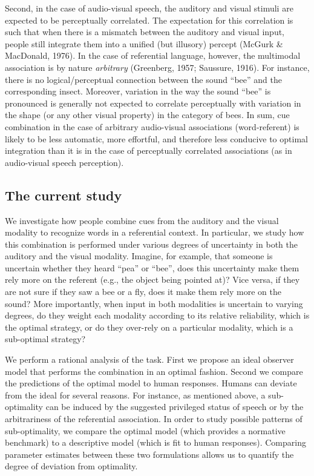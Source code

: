 \documentclass[english,floatsintext,man]{apa6}
\theoremstyle{definition}
\theoremstyle{definition}
\theoremstyle{definition}
\theoremstyle{remark}
\begin{document}
Second, in the case of audio-visual speech, the auditory and visual
stimuli are expected to be perceptually correlated. The expectation for
this correlation is such that when there is a mismatch between the
auditory and visual input, people still integrate them into a unified
(but illusory) percept (McGurk \& MacDonald, 1976). In the case of
referential language, however, the multimodal association is by nature
\emph{arbitrary} (Greenberg, 1957; Saussure, 1916). For instance, there
is no logical/perceptual connection between the sound \enquote{bee} and
the corresponding insect. Moreover, variation in the way the sound
\enquote{bee} is pronounced is generally not expected to correlate
perceptually with variation in the shape (or any other visual property)
in the category of bees. In sum, cue combination in the case of
arbitrary audio-visual associations (word-referent) is likely to be less
automatic, more effortful, and therefore less conducive to optimal
integration than it is in the case of perceptually correlated
associations (as in audio-visual speech perception).

\subsection{The current study}\label{the-current-study}

We investigate how people combine cues from the auditory and the visual
modality to recognize words in a referential context. In particular, we
study how this combination is performed under various degrees of
uncertainty in both the auditory and the visual modality. Imagine, for
example, that someone is uncertain whether they heard \enquote{pea} or
\enquote{bee}, does this uncertainty make them rely more on the referent
(e.g., the object being pointed at)? Vice versa, if they are not sure if
they saw a bee or a fly, does it make them rely more on the sound? More
importantly, when input in both modalities is uncertain to varying
degrees, do they weight each modality according to its relative
reliability, which is the optimal strategy, or do they over-rely on a
particular modality, which is a sub-optimal strategy?

We perform a rational analysis of the task. First we propose an ideal
observer model that performs the combination in an optimal fashion.
Second we compare the predictions of the optimal model to human
responses. Humans can deviate from the ideal for several reasons. For
instance, as mentioned above, a sub-optimality can be induced by the
suggested privileged status of speech or by the arbitrariness of the
referential association. In order to study possible patterns of
sub-optimality, we compare the optimal model (which provides a normative
benchmark) to a descriptive model (which is fit to human responses).
Comparing parameter estimates between these two formulations allows us
to quantify the degree of deviation from optimality.
\end{document}
